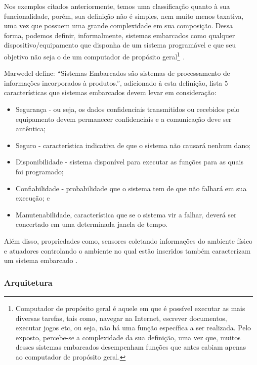Nos exemplos citados anteriormente, temos uma classificação quanto à sua
funcionalidade, porém, sua definição não é simples, nem muito menos taxativa,
uma vez que possuem uma grande complexidade em sua composição. Dessa forma,
podemos definir, informalmente, sistemas embarcados como qualquer
dispositivo/equipamento que disponha de um sistema programável e que seu
objetivo não seja o de um computador de propósito geral\footnote{Computador de
propósito geral é aquele em que é possível executar as mais diversas tarefas,
tais como, navegar na Internet, escrever documentos, executar jogos etc, ou
seja, não há uma função específica a ser realizada. Pelo exposto, percebe-se a
complexidade da sua definição, uma vez que, muitos desses sistemas embarcados
desempenham funções que antes cabiam apenas ao computador de propósito geral.}
\cite{wolf2012computers}.

Marwedel define: ``Sistemas Embarcados são sistemas de processamento de
informações incorporados à produtos.'', adicionado à esta definição, lista 5
características que sistemas embarcados devem levar em consideração: 

\begin{itemize}
  \item Segurança - ou seja, os dados confidenciais transmitidos ou recebidos pelo
  equipamento devem permanecer confidenciais e a comunicação deve ser autêntica;
  \item Seguro - característica indicativa de que o sistema não causará nenhum dano;
  \item Disponibilidade - sistema disponível para executar as funções para as quais
  foi programado; 
  \item Confiabilidade - probabilidade que o sistema tem de que não
  falhará em sua execução; e
  \item Manutenabilidade, característica  que se o sistema vir a falhar, deverá 
  ser concertado em uma determinada janela de tempo.
\end{itemize}

Além disso, propriedades como, sensores coletando informações do ambiente
físico e atuadores controlando o ambiente no qual estão inseridos também
caracterizam um sistema embarcado \cite{marwedel2010embedded}.

\subsubsection{Arquitetura}\label{subsubsec:arquitetura}

